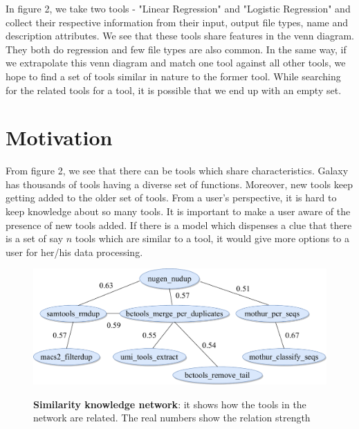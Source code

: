 In figure 2, we take two tools - "Linear Regression" and "Logistic Regression" and collect their respective information from their input, output file types, name and description attributes. We see that these tools share features in the venn diagram. They both do regression and few file types are also common. In the same way, if we extrapolate this venn diagram and match one tool against all other tools, we hope to find a set of tools similar in nature to the former tool. While searching for the related tools for a tool, it is possible that we end up with an empty set.

\section{Motivation}
From figure 2, we see that there can be tools which share characteristics. Galaxy has thousands of tools having a diverse set of functions. Moreover, new tools keep getting added to the older set of tools. From a user's perspective, it is hard to keep knowledge about so many tools. It is important to make a user aware of the presence of new tools added. If there is a model which dispenses a clue that there is a set of say $n$ tools which are similar to a tool, it would give more options to a user for her/his data processing. 

\begin{figure}[h]
\begin{centering}
    {\includegraphics[scale=0.5]{figures/tools_sim_know_graph.pdf}}
    \caption[Similarity knowledge network]{\textbf{Similarity knowledge network}: it shows how the tools in the network are related. The real numbers show the relation strength}
\end{centering}
\end{figure}


